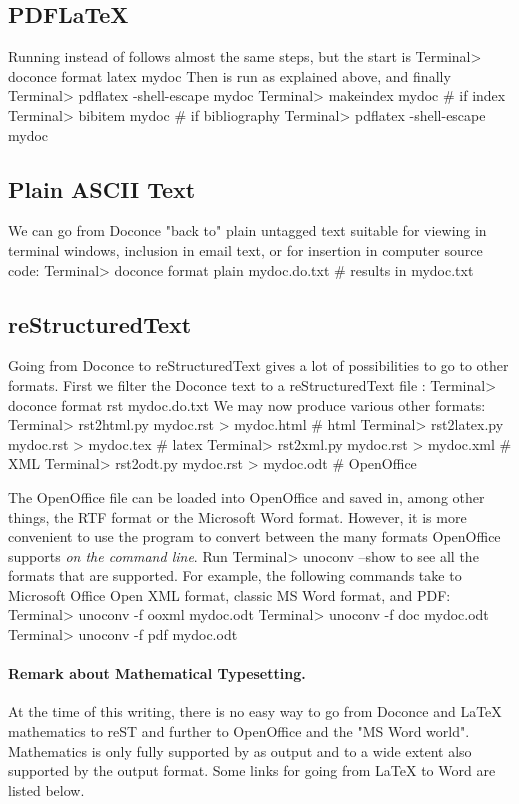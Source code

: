 \documentclass[%
oneside,                 %
final,                   %
10pt]{article}
\begin{document}
{{{{{\subsection{PDFLaTeX}

Running  instead of  follows almost the same steps,
but the start is
\bsys
Terminal> doconce format latex mydoc
\esys
Then  is run as explained above, and finally
\bsys
Terminal> pdflatex -shell-escape mydoc
Terminal> makeindex mydoc   # if index
Terminal> bibitem mydoc     # if bibliography
Terminal> pdflatex -shell-escape mydoc
\esys

\subsection{Plain ASCII Text}

We can go from Doconce "back to" plain untagged text suitable for viewing
in terminal windows, inclusion in email text, or for insertion in
computer source code:
\bsys
Terminal> doconce format plain mydoc.do.txt  # results in mydoc.txt
\esys

\subsection{reStructuredText}

Going from Doconce to reStructuredText gives a lot of possibilities to
go to other formats. First we filter the Doconce text to a
reStructuredText file :
\bsys
Terminal> doconce format rst mydoc.do.txt
\esys
We may now produce various other formats:
\bsys
Terminal> rst2html.py  mydoc.rst > mydoc.html # html
Terminal> rst2latex.py mydoc.rst > mydoc.tex  # latex
Terminal> rst2xml.py   mydoc.rst > mydoc.xml  # XML
Terminal> rst2odt.py   mydoc.rst > mydoc.odt  # OpenOffice
\esys

The OpenOffice file  can be loaded into OpenOffice and
saved in, among other things, the RTF format or the Microsoft Word format.
However, it is more convenient to use the program 
to convert between the many formats OpenOffice supports \emph{on the command line}.
Run
\bsys
Terminal> unoconv --show
\esys
to see all the formats that are supported.
For example, the following commands take
 to Microsoft Office Open XML format,
classic MS Word format, and PDF:
\bsys
Terminal> unoconv -f ooxml mydoc.odt
Terminal> unoconv -f doc mydoc.odt
Terminal> unoconv -f pdf mydoc.odt
\esys

\paragraph{Remark about Mathematical Typesetting.}
At the time of this writing, there is no easy way to go from Doconce
and {\LaTeX} mathematics to reST and further to OpenOffice and the
"MS Word world". Mathematics is only fully supported by  as
output and to a wide extent also supported by the  output format.
Some links for going from {\LaTeX} to Word are listed below.

}}}}}
\end{document}
